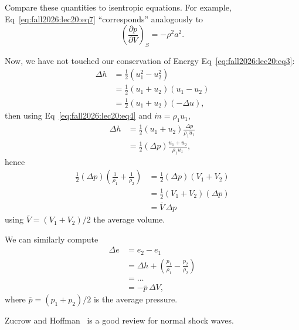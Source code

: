 \begin{node}
Compare these quantities to isentropic equations. For example,
Eq~\eqref{eq:fall2026:lec20:eq7}
``corresponds'' analogously to
\begin{equation}
\left(\frac{\partial p}{\partial V}\right)_{S} = -\rho^{2}a^{2}.
\end{equation}
\end{node}

\begin{node}
Now, we have not touched our conservation of Energy Eq~\eqref{eq:fall2026:lec20:eq3}:
\begin{subequations}
  \begin{align}
\Delta h &= \frac{1}{2}(u_{1}^{2}-u_{2}^{2})\\
&= \frac{1}{2}(u_{1}+u_{2})(u_{1}-u_{2})\\
&= \frac{1}{2}(u_{1}+u_{2})(-\Delta u),
  \end{align}
\end{subequations}
then using Eq~\eqref{eq:fall2026:lec20:eq4} and $\dot{m}=\rho_{1}u_{1}$,
\begin{subequations}
  \begin{align}
\Delta h &= \frac{1}{2}(u_{1}+u_{2})\frac{\Delta p}{\rho_{1}u_{1}}\\
&=\frac{1}{2}(\Delta p)\frac{u_{1}+u_{2}}{\rho_{1}u_{1}},
  \end{align}
\end{subequations}
hence
\begin{subequations}
  \begin{align}
\frac{1}{2}(\Delta p)\left(\frac{1}{\rho_{1}}+\frac{1}{\rho_{2}}\right)
&=\frac{1}{2}(\Delta p)(V_{1}+V_{2})\\
&=\frac{1}{2}(V_{1}+V_{2})(\Delta p)\\
&=\overline{V}\,\Delta p
  \end{align}
\end{subequations}
using $\overline{V}=(V_{1}+V_{2})/2$ the average volume.
\end{node}

\begin{node}
We can similarly compute
\begin{subequations}
  \begin{align}
\Delta e &= e_{2}-e_{1}\\
&=\Delta h + \left(\frac{p_{1}}{\rho_{1}}-\frac{p_{2}}{\rho_{2}}\right)\\
&=\dots\\
&=-\overline{p}\,\Delta V,
  \end{align}
\end{subequations}
where $\overline{p}=(p_{1}+p_{2})/2$ is the average pressure.
\end{node}

\begin{remark}
Zucrow and Hoffman~\cite[\S7--3~\textit{et~seq}]{zucrow1976gas}
is a good review for normal shock waves.
\end{remark}